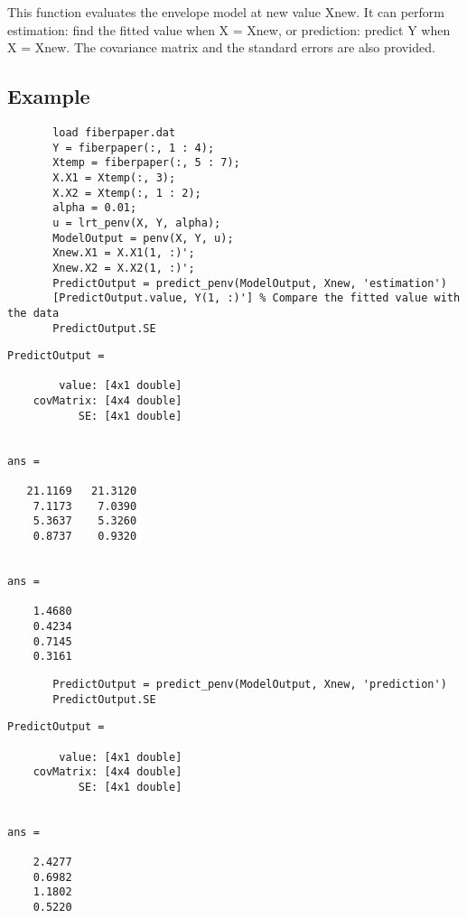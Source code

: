 \documentclass[a4paper,11pt,openany]{memoir}
\begin{document}
\begin{par}
This function evaluates the envelope model at new value Xnew.  It can perform estimation: find the fitted value when X = Xnew, or prediction: predict Y when X = Xnew.  The covariance matrix and the standard errors are also provided.
\end{par} \vspace{1em}


\subsection*{Example}


\begin{verbatim}       load fiberpaper.dat
       Y = fiberpaper(:, 1 : 4);
       Xtemp = fiberpaper(:, 5 : 7);
       X.X1 = Xtemp(:, 3);
       X.X2 = Xtemp(:, 1 : 2);
       alpha = 0.01;
       u = lrt_penv(X, Y, alpha);
       ModelOutput = penv(X, Y, u);
       Xnew.X1 = X.X1(1, :)';
       Xnew.X2 = X.X2(1, :)';
       PredictOutput = predict_penv(ModelOutput, Xnew, 'estimation')
       [PredictOutput.value, Y(1, :)'] % Compare the fitted value with the data
       PredictOutput.SE\end{verbatim}
    
        \color{lightgray}\ttfamily \begin{verbatim}
PredictOutput = 

        value: [4x1 double]
    covMatrix: [4x4 double]
           SE: [4x1 double]


ans =

   21.1169   21.3120
    7.1173    7.0390
    5.3637    5.3260
    0.8737    0.9320


ans =

    1.4680
    0.4234
    0.7145
    0.3161
\end{verbatim} \rmfamily
\color{black}

       \begin{verbatim}
       PredictOutput = predict_penv(ModelOutput, Xnew, 'prediction')
       PredictOutput.SE\end{verbatim}
        \color{lightgray}\ttfamily \begin{verbatim}
PredictOutput = 

        value: [4x1 double]
    covMatrix: [4x4 double]
           SE: [4x1 double]


ans =

    2.4277
    0.6982
    1.1802
    0.5220

\end{verbatim} \rmfamily
\color{black}
\end{document}
